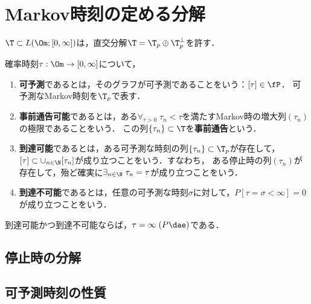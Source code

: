 \documentclass[uplatex,dvipdfmx]{jsreport}
\begin{document}
\section{Markov時刻の定める分解}

\begin{tcolorbox}[colframe=ForestGreen, colback=ForestGreen!10!white,breakable,colbacktitle=ForestGreen!40!white,coltitle=black,fonttitle=\bfseries\sffamily,
title=]
    $\T\subset L(\Om;[0,\infty])$は，直交分解$\T=\T_p\oplus \T_p^\perp$を許す．
\end{tcolorbox}

\begin{definition}
    確率時刻$\tau:\Om\to[0,\infty]$について，
    \begin{enumerate}
        \item \textbf{可予測}であるとは，そのグラフが可予測であることをいう：$[\tau]\in\fP$．
        可予測なMarkov時刻を$\T_p$で表す．
        \item \textbf{事前通告可能}であるとは，ある$\forall_{\tau>0}\;\tau_n<\tau$を満たすMarkov時の増大列$(\tau_n)$の極限であることをいう．
        この列$\{\tau_n\}\subset\T$を\textbf{事前通告}という．
        \item \textbf{到達可能}であるとは，ある可予測な時刻の列$\{\tau_n\}\subset\T_p$が存在して，$[\tau]\subset\cup_{n\in\N}[\tau_n]$が成り立つことをいう．すなわち，
        ある停止時の列$(\tau_n)$が存在して，殆ど確実に$\exists_{n\in\N}\;\tau_n=\tau$が成り立つことをいう．
        \item \textbf{到達不可能}であるとは，任意の可予測な時刻$\sigma$に対して，$P[\tau=\sigma<\infty]=0$が成り立つことをいう．
    \end{enumerate}
\end{definition}
\begin{example}
    到達可能かつ到達不可能ならば，$\tau=\infty\;(P\dae)$である．
\end{example}

\subsection{停止時の分解}

\begin{theorem}[停止時の分解]
    
\end{theorem}

\subsection{可予測時刻の性質}
\end{document}

